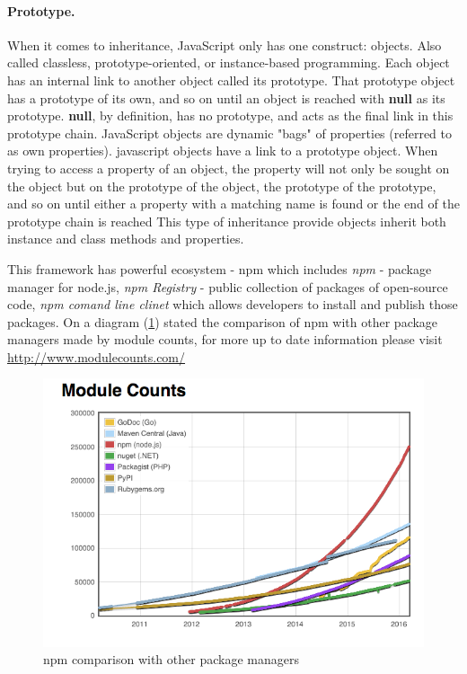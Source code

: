 \paragraph{Prototype.} When it comes to inheritance, JavaScript only has one construct: objects\cite{mdnProto}.
Also called classless, prototype-oriented, or instance-based programming\cite{mdnOOP}. Each object has an internal link to another object called its prototype. That prototype object has a prototype of its own, and so on until an object is reached with \textbf{null} as its prototype. \textbf{null}, by definition, has no prototype, and acts as the final link in this prototype chain. JavaScript objects are dynamic "bags" of properties (referred to as own properties). javascript objects have a link to a prototype object. When trying to access a property of an object, the property will not only be sought on the object but on the prototype of the object, the prototype of the prototype, and so on until either a property with a matching name is found or the end of the prototype chain is reached\cite{mdnProto} This type of inheritance provide objects inherit both instance and class methods and properties.

 
This framework has powerful ecosystem - npm which includes \textit{npm} - package manager for node.js, \textit{npm Registry} - public collection of packages of open-source code, \textit{npm comand line clinet} which allows developers to install and publish those packages. On a diagram (\ref{fig:npmStat}) stated the comparison of npm with other package managers made by module counts, for more up to date information please visit \url{http://www.modulecounts.com/}
\begin{figure}[ht]
  	\label{fig:npmStat}
    \centering
    \includegraphics[width=\textwidth]{grafiken/modulecounts.png}
     \caption{npm comparison with other package managers\cite{moduleCounts}}
  \end{figure}

